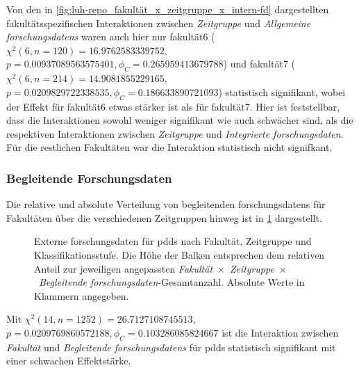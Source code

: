 Von den in \cref{fig:luh-repo_fakultät_x_zeitgruppe_x_intern-fd} dargestellten fakultätsspezifischen Interaktionen zwischen \textit{Zeitgruppe} und \textit{Allgemeine \glspl{forschungsdaten}} waren auch hier nur \gls{fakultät6} ($\chi^2 (\num{6}, n=\num{120}) = \num[round-mode=places,round-precision=2]{16.9762583339752}$, $p = \num[round-mode=places,round-precision=2]{0.00937089563575401},\phi_C=\num[round-mode=places,round-precision=2]{0.265959413679788}$) und \gls{fakultät7} ($\chi^2 (\num{6}, n=\num{214}) = \num[round-mode=places,round-precision=2]{14.9081855229165}$, $p = \num[round-mode=places,round-precision=2]{0.0209829722338535},\phi_C=\num[round-mode=places,round-precision=2]{0.186633890721093}$) statistisch signifikant, wobei der Effekt für \gls{fakultät6} etwas stärker ist als für \gls{fakultät7}.
Hier ist feststellbar, dass die Interaktionen sowohl weniger signifikant wie auch schwächer sind, als die respektiven Interaktionen zwischen \textit{Zeitgruppe} und \textit{Integrierte \gls{forschungsdaten}}.
Für die restlichen Fakultäten war die Interaktion statistisch nicht signifkant.

\subsubsection{Begleitende Forschungsdaten}
Die relative und absolute Verteilung von begleitenden \glspl{forschungsdaten} für Fakultäten über die verschiedenen Zeitgruppen hinweg ist in \cref{fig:luh-repo_fakultät_x_zeitgruppe_x_begleit-fd} dargestellt.
\begin{figure}[!htbp]
    \resizebox{\ifdim\width>\textwidth\textwidth\else\width\fi}{!}{}
    \caption{Externe \gls{forschungsdaten} für \glspl{pdd} nach Fakultät, Zeitgruppe und Klassifikationsstufe.
    Die Höhe der Balken entsprechen dem relativen Anteil zur jeweiligen angepassten \textit{Fakultät}~$\times$~\textit{Zeitgruppe}~$\times$~\textit{Begleitende \gls{forschungsdaten}}-Gesamtanzahl.
    Absolute Werte in Klammern angegeben.}
    \label{fig:luh-repo_fakultät_x_zeitgruppe_x_begleit-fd}
\end{figure}
Mit $\chi^2 (\num{14}, n=\num{1252}) = \num[round-mode=places,round-precision=2]{26.7127108745513}$, $p = \num[round-mode=places,round-precision=2]{0.0209769860572188},\phi_C=\num[round-mode=places,round-precision=2]{0.103286085824667}$ ist die Interaktion zwischen \textit{Fakultät} und \textit{Begleitende \glspl{forschungsdaten}} für \glspl{pdd} statistisch signifikant mit einer schwachen Effektstärke.

